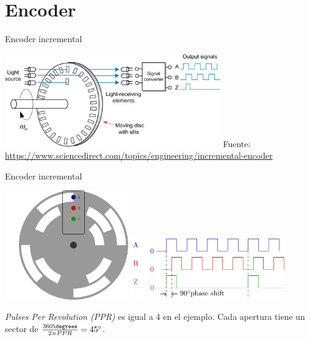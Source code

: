 \documentclass[presentation,aspectratio=169]{beamer}
\begin{document}
\section{Encoder}
\label{sec:org6940255}
\begin{frame}[label={sec:org00a43d0}]{Encoder incremental}
\begin{center}
\includegraphics[width=0.7\textwidth]{../../figures/encoder-im.jpg}
{\footnotesize Fuente: \url{https://www.sciencedirect.com/topics/engineering/incremental-encoder}}
\end{center}
\end{frame}

\begin{frame}[label={sec:org7cff6cb}]{Encoder incremental}
\begin{center}
\includegraphics[width=0.4\textwidth]{../../figures/encoder-disc}
\includegraphics[width=0.5\textwidth]{../../figures/encoder-signals}
\end{center}

\emph{Pulses Per Revolution (PPR)} es igual a 4 en el ejemplo. Cada apertura tiene un sector de \(\frac{360\degrees}{2 \times PPR} = 45\degree\).
\end{frame}
\end{document}
